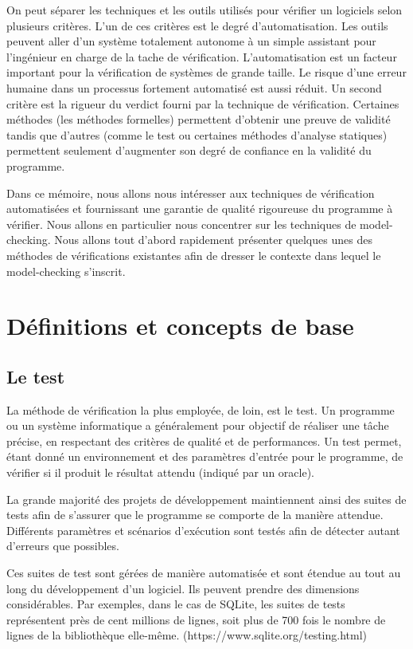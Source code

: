 On peut séparer les techniques et les outils utilisés pour vérifier un
logiciels selon plusieurs critères. L'un de ces critères est le degré
d'automatisation. Les outils peuvent aller d'un système totalement
autonome à un simple assistant pour l'ingénieur en charge de la tache de
vérification. L'automatisation est un facteur important pour la
vérification de systèmes de grande taille. Le risque d'une erreur
humaine dans un processus fortement automatisé est aussi réduit. Un
second critère est la rigueur du verdict fourni par la technique de
vérification. Certaines méthodes (les méthodes formelles) permettent
d'obtenir une preuve de validité tandis que d'autres (comme le test ou
certaines méthodes d'analyse statiques) permettent seulement d'augmenter
son degré de confiance en la validité du programme.

Dans ce mémoire, nous allons nous intéresser aux techniques de
vérification automatisées et fournissant une garantie de qualité
rigoureuse du programme à vérifier. Nous allons en particulier nous
concentrer sur les techniques de model-checking. Nous allons tout
d'abord rapidement présenter quelques unes des méthodes de vérifications
existantes afin de dresser le contexte dans lequel le model-checking
s'inscrit.

\section{Définitions et concepts de base}  %

\subsection{Le test}

La méthode de vérification la plus employée, de loin, est le test. Un
programme ou un système informatique a généralement pour objectif de
réaliser une tâche précise, en respectant des critères de qualité et de
performances. Un test permet, étant donné un environnement et des
paramètres d'entrée pour le programme, de vérifier si il produit le
résultat attendu (indiqué par un oracle).

La grande majorité des projets de développement maintiennent ainsi des
suites de tests afin de s'assurer que le programme se comporte de la
manière attendue. Différents paramètres et scénarios d'exécution sont
testés afin de détecter autant d'erreurs que possibles.

Ces suites de test sont gérées de manière automatisée et sont étendue au
tout au long du développement d'un logiciel. Ils peuvent prendre des
dimensions considérables. Par exemples, dans le cas de SQLite, les
suites de tests représentent près de cent millions de lignes, soit plus
de 700 fois le nombre de lignes de la bibliothèque elle-même.
(https://www.sqlite.org/testing.html)

